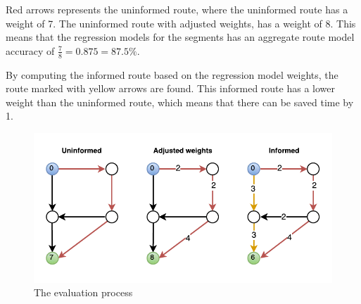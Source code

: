Red arrows represents the uninformed route, where the uninformed route has a weight of 7. The uninformed route with adjusted weights, has a weight of 8. This means that the regression models for the segments has an aggregate route model accuracy of $\frac{7}{8}=0.875=87.5\%$. 

By computing the informed route based on the regression model weights, the route marked with yellow arrows are found. This informed route has a lower weight than the uninformed route, which means that there can be saved time by 1.

\begin{figure}
\centering
\includegraphics[width=\textwidth]{figures/eval.pdf}
\caption{The evaluation process}
\label{fig:eval}
\end{figure}

